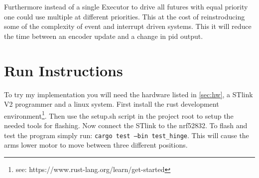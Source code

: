 \documentclass[lang=en, hanging-titles=true]{skrapport}
\begin{document}
Furthermore instead of a single Executor to drive all futures with equal priority one could use multiple at different priorities. This at the cost of reinstroducing some of the complexity of event and interrupt driven systems. This it will reduce the time between an encoder update and a change in pid output.

\clearpage
\appendix
\section{Run Instructions}
To try my implementation you will need the hardware listed in \cref{sec:hw}, a STlink V2 programmer and a linux system. First install the rust development environment\footnote{see: https://www.rust-lang.org/learn/get-started}. Then use the setup.sh script in the project root to setup the needed tools for flashing. Now connect the STlink to the nrf52832. To flash and test the program simply run: \texttt{cargo test ---bin test\_hinge}. This will cause the arms lower motor to move between three different positions.

\printbibliography
\end{document}
